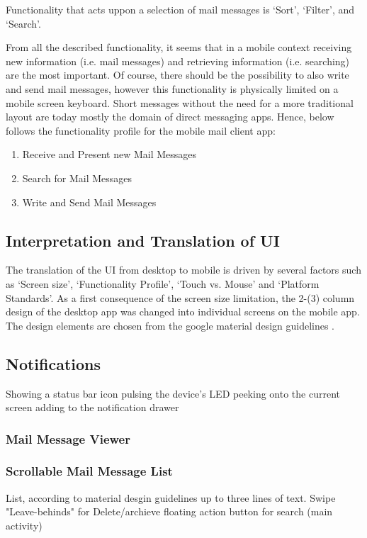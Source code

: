 \documentclass[a4paper,11pt,twoside]{article}
\begin{document}
Functionality that acts uppon a selection of mail messages is `Sort', `Filter',
and `Search'.

From all the described functionality, it seems that in a mobile context receiving
new information (i.e. mail messages) and retrieving information (i.e. searching)
are the most important. Of course, there should be the possibility to also write
and send mail messages, however this functionality is physically limited on a
mobile screen keyboard. Short messages without the need for a more traditional
layout are today mostly the domain of direct messaging apps. Hence, below follows the
functionality profile for the mobile mail client app:

\begin{enumerate}
  \item Receive and Present new Mail Messages
  \item Search for Mail Messages
  \item Write and Send Mail Messages
\end{enumerate}


\subsection{Interpretation and Translation of UI}
The translation of the UI from desktop to mobile is driven by several factors such
as `Screen size', `Functionality Profile', `Touch vs. Mouse' and `Platform Standards'.
As a first consequence of the screen size limitation, the 2-(3) column design
of the desktop app was changed into individual screens on the mobile app. The design
elements are chosen from the google material design guidelines \cite{materialdesign}.



\subsection{Notifications}
Showing a status bar icon
pulsing the device's LED
peeking onto the current screen
adding to the notification drawer

\subsubsection{Mail Message Viewer}




\subsubsection{Scrollable Mail Message List}
List, according to material desgin guidelines up to three lines of text.
Swipe "Leave-behinds" for Delete/archieve
floating action button for search (main activity)
\end{document}

